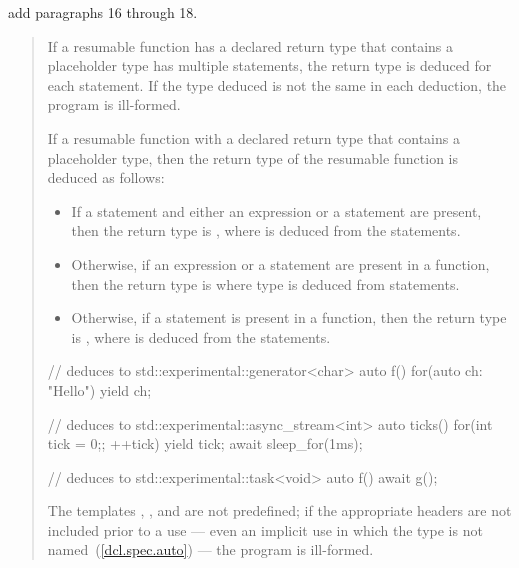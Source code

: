 add paragraphs 16 through 18.

\begin{quote}
\setcounter{Paras}{15}
\pnum
If a resumable function has a declared return type that contains a placeholder type has multiple  statements, the return type is deduced for each
 statement. If the type deduced is not the same in each
deduction, the program is ill-formed.

\pnum
If a resumable function with a declared return type that contains a placeholder type, then the return type of the resumable function is deduced as follows:

\begin{itemize}
\item If a  statement and either an  expression or a  statement are present, then
the return type is , where  is deduced from the  statements.

\item Otherwise, if an  expression or a  statement are present in a function, then
the return type is  where type  is deduced from 
 statements.

\item Otherwise, if a  statement is present in a function, then the return type is \linebreak
{},
where  is deduced from the  statements.

\end{itemize}
\enterexample
\begin{codeblock}
// deduces to std::experimental::generator<char>
auto f() { for(auto ch: "Hello") yield ch; }

// deduces to std::experimental::async_stream<int>
auto ticks() {
  for(int tick = 0;; ++tick) {
    yield tick;
    await sleep_for(1ms);
  }
}

// deduces to std::experimental::task<void>
auto f() {  await g(); }

\end{codeblock}
\exitexample

\pnum
The templates  , 
, and %
{} are not predefined;
if the appropriate headers are not included prior to a use --- even an implicit use in which the type is not
named~(\ref{dcl.spec.auto}) --- the program is ill-formed.
\end{quote}
